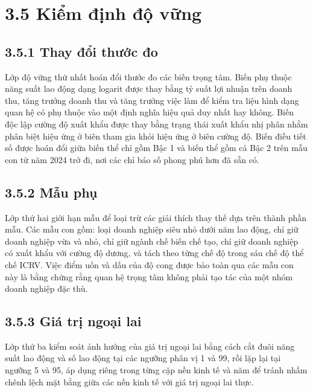 \documentclass[
  a4paper,
  13pt]{extreport}
\begin{document}
\hypertarget{kiux1ec3m-ux111ux1ecbnh-ux111ux1ed9-vux1eefng}{%
\section{3.5 Kiểm định độ
vững}\label{kiux1ec3m-ux111ux1ecbnh-ux111ux1ed9-vux1eefng}}

\hypertarget{thay-ux111ux1ed5i-thux1b0ux1edbc-ux111o}{%
\subsection{3.5.1 Thay đổi thước
đo}\label{thay-ux111ux1ed5i-thux1b0ux1edbc-ux111o}}

Lớp độ vững thứ nhất hoán đổi thước đo các biến trọng tâm. Biến phụ
thuộc năng suất lao động dạng logarit được thay bằng tỷ suất lợi nhuận
trên doanh thu, tăng trưởng doanh thu và tăng trưởng việc làm để kiểm
tra liệu hình dạng quan hệ có phụ thuộc vào một định nghĩa hiệu quả duy
nhất hay không. Biến độc lập cường độ xuất khẩu được thay bằng trạng
thái xuất khẩu nhị phân nhằm phân biệt hiệu ứng ở biên tham gia khỏi
hiệu ứng ở biên cường độ. Biến điều tiết số được hoán đổi giữa biến thể
chỉ gồm Bậc 1 và biến thể gồm cả Bậc 2 trên mẫu con từ năm 2024 trở đi,
nơi các chỉ báo số phong phú hơn đã sẵn có.

\hypertarget{mux1eabu-phux1ee5}{%
\subsection{3.5.2 Mẫu phụ}\label{mux1eabu-phux1ee5}}

Lớp thứ hai giới hạn mẫu để loại trừ các giải thích thay thế dựa trên
thành phần mẫu. Các mẫu con gồm: loại doanh nghiệp siêu nhỏ dưới năm lao
động, chỉ giữ doanh nghiệp vừa và nhỏ, chỉ giữ ngành chế biến chế tạo,
chỉ giữ doanh nghiệp có xuất khẩu với cường độ dương, và tách theo từng
chế độ trong sáu chế độ thể chế ICRV. Việc điểm uốn và dấu của độ cong
được bảo toàn qua các mẫu con này là bằng chứng rằng quan hệ trọng tâm
không phải tạo tác của một nhóm doanh nghiệp đặc thù.

\hypertarget{giuxe1-trux1ecb-ngoux1ea1i-lai}{%
\subsection{3.5.3 Giá trị ngoại
lai}\label{giuxe1-trux1ecb-ngoux1ea1i-lai}}

Lớp thứ ba kiểm soát ảnh hưởng của giá trị ngoại lai bằng cách cắt đuôi
năng suất lao động và số lao động tại các ngưỡng phân vị 1 và 99, rồi
lặp lại tại ngưỡng 5 và 95, áp dụng riêng trong từng cặp nền kinh tế và
năm để tránh nhầm chênh lệch mặt bằng giữa các nền kinh tế với giá trị
ngoại lai thực.
\end{document}

